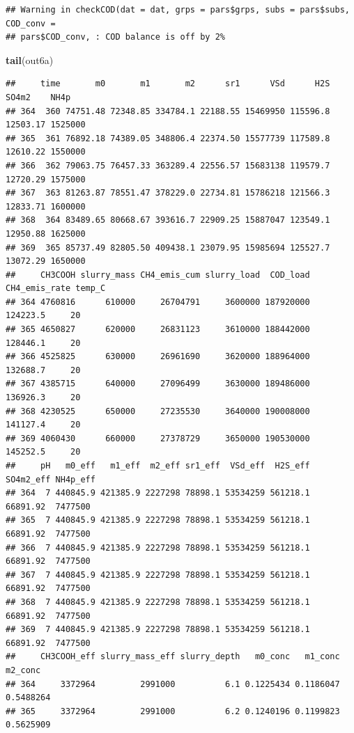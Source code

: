 \documentclass[
]{article}
\newenvironment{Shaded}{\begin{snugshade}}{\end{snugshade}}
\newcommand{\FunctionTok}[1]{\textcolor[rgb]{0.13,0.29,0.53}{\textbf{#1}}}
\newcommand{\NormalTok}[1]{#1}
\begin{document}
\begin{verbatim}
## Warning in checkCOD(dat = dat, grps = pars$grps, subs = pars$subs, COD_conv =
## pars$COD_conv, : COD balance is off by 2%
\end{verbatim}

\begin{Shaded}
\begin{Highlighting}[]
\FunctionTok{tail}\NormalTok{(out6a)}
\end{Highlighting}
\end{Shaded}

\begin{verbatim}
##     time       m0       m1       m2      sr1      VSd      H2S    SO4m2    NH4p
## 364  360 74751.48 72348.85 334784.1 22188.55 15469950 115596.8 12503.17 1525000
## 365  361 76892.18 74389.05 348806.4 22374.50 15577739 117589.8 12610.22 1550000
## 366  362 79063.75 76457.33 363289.4 22556.57 15683138 119579.7 12720.29 1575000
## 367  363 81263.87 78551.47 378229.0 22734.81 15786218 121566.3 12833.71 1600000
## 368  364 83489.65 80668.67 393616.7 22909.25 15887047 123549.1 12950.88 1625000
## 369  365 85737.49 82805.50 409438.1 23079.95 15985694 125527.7 13072.29 1650000
##     CH3COOH slurry_mass CH4_emis_cum slurry_load  COD_load CH4_emis_rate temp_C
## 364 4760816      610000     26704791     3600000 187920000      124223.5     20
## 365 4650827      620000     26831123     3610000 188442000      128446.1     20
## 366 4525825      630000     26961690     3620000 188964000      132688.7     20
## 367 4385715      640000     27096499     3630000 189486000      136926.3     20
## 368 4230525      650000     27235530     3640000 190008000      141127.4     20
## 369 4060430      660000     27378729     3650000 190530000      145252.5     20
##     pH   m0_eff   m1_eff  m2_eff sr1_eff  VSd_eff  H2S_eff SO4m2_eff NH4p_eff
## 364  7 440845.9 421385.9 2227298 78898.1 53534259 561218.1  66891.92  7477500
## 365  7 440845.9 421385.9 2227298 78898.1 53534259 561218.1  66891.92  7477500
## 366  7 440845.9 421385.9 2227298 78898.1 53534259 561218.1  66891.92  7477500
## 367  7 440845.9 421385.9 2227298 78898.1 53534259 561218.1  66891.92  7477500
## 368  7 440845.9 421385.9 2227298 78898.1 53534259 561218.1  66891.92  7477500
## 369  7 440845.9 421385.9 2227298 78898.1 53534259 561218.1  66891.92  7477500
##     CH3COOH_eff slurry_mass_eff slurry_depth   m0_conc   m1_conc   m2_conc
## 364     3372964         2991000          6.1 0.1225434 0.1186047 0.5488264
## 365     3372964         2991000          6.2 0.1240196 0.1199823 0.5625909

\end{verbatim}
\end{document}
